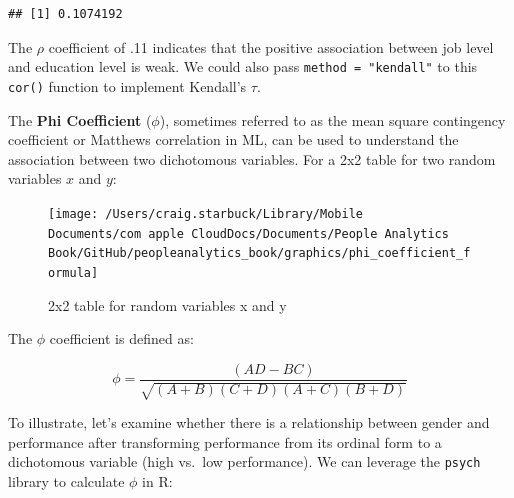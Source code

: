 \documentclass[
]{book}
\newenvironment{Shaded}{\begin{snugshade}}{\end{snugshade}}
\newcommand{\CommentTok}[1]{\textcolor[rgb]{0.56,0.35,0.01}{\textit{#1}}}
\newcommand{\DecValTok}[1]{\textcolor[rgb]{0.00,0.00,0.81}{#1}}
\newcommand{\FunctionTok}[1]{\textcolor[rgb]{0.00,0.00,0.00}{#1}}
\newcommand{\NormalTok}[1]{#1}
\newcommand{\OtherTok}[1]{\textcolor[rgb]{0.56,0.35,0.01}{#1}}
\newcommand{\SpecialCharTok}[1]{\textcolor[rgb]{0.00,0.00,0.00}{#1}}
\newcommand{\StringTok}[1]{\textcolor[rgb]{0.31,0.60,0.02}{#1}}
\begin{document}
\begin{verbatim}
## [1] 0.1074192
\end{verbatim}

The \(\rho\) coefficient of .11 indicates that the positive association between job level and education level is weak. We could also pass \texttt{method\ =\ "kendall"} to this \texttt{cor()} function to implement Kendall's \(\tau\).

The \textbf{Phi Coefficient} (\(\phi\)), sometimes referred to as the mean square contingency coefficient or Matthews correlation in ML, can be used to understand the association between two dichotomous variables. For a 2x2 table for two random variables \(x\) and \(y\):

\begin{figure}

{\centering \texttt{[image: /Users/craig.starbuck/Library/Mobile Documents/com~apple~CloudDocs/Documents/People Analytics Book/GitHub/peopleanalytics\_book/graphics/phi\_coefficient\_formula]} 

}

\caption{2x2 table for random variables x and y}\label{fig:phi-tbl}
\end{figure}

The \(\phi\) coefficient is defined as:

\[ \phi = {\frac {(AD-BC)}{\sqrt{(A+B)(C+D)(A+C)(B+D)}}} \]

To illustrate, let's examine whether there is a relationship between gender and performance after transforming performance from its ordinal form to a dichotomous variable (high vs.~low performance). We can leverage the \texttt{psych} library to calculate \(\phi\) in R:

\begin{Shaded}
\end{Shaded}
\end{document}
